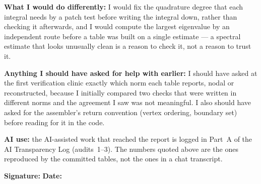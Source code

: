 \begin{formbox}
\textbf{What I would do differently:} I would fix the quadrature degree
that each integral needs by a patch test before writing the integral down,
rather than checking it afterwards, and I would compute the largest
eigenvalue by an independent route before a table was built on a single
estimate --- a spectral estimate that looks unusually clean is a reason to
check it, not a reason to trust it.

\textbf{Anything I should have asked for help with earlier:} I should have
asked at the first verification clinic exactly which norm each table
reports, nodal or reconstructed, because I initially compared two checks
that were written in different norms and the agreement I saw was not
meaningful. I also should have asked for the assembler's return convention
(vertex ordering, boundary set) before reading for it in the code.

\textbf{AI use:} the AI-assisted work that reached the report is logged in
Part~A of the AI Transparency Log (audits~1--3). The numbers quoted above
are the ones reproduced by the committed tables, not the ones in a chat
transcript.

\vfill
\textbf{Signature:} \underline{\hspace{4.5cm}} \hfill
\textbf{Date:} \underline{\hspace{2.5cm}}
\end{formbox}

